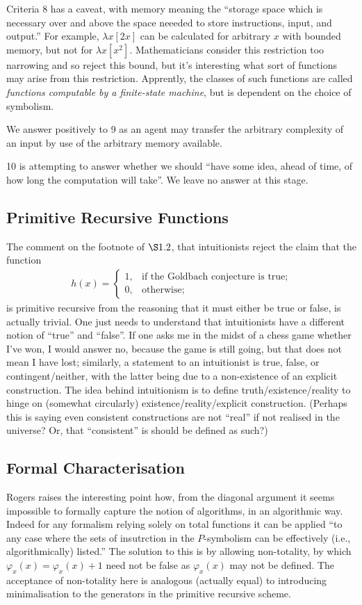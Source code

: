 \documentclass{article}
\theoremstyle{definition}
\begin{document}
Criteria 8 has a caveat, with memory meaning the ``storage space which is necessary over and above the space neeeded to store instructions, input, and output.'' For example, $\lambda x[2x]$ can be calculated for arbitrary $x$ with bounded memory, but not for $\lambda x[x^2]$. Mathematicians consider this restriction too narrowing and so reject this bound, but it's interesting what sort of functions may arise from this restriction. Apprently, the classes of such functions are called \emph{functions computable by a finite-state  machine}, but is dependent on the choice of symbolism.\par
We answer positively to 9 as an agent may transfer the arbitrary complexity of an input by use of the arbitrary memory available.\par
10 is attempting to answer whether we should ``have some idea, ahead of time, of how long the computation will take''. We leave no answer at this stage.
\subsection{Primitive Recursive Functions}
The comment on the footnote of $\S1.2$, that intuitionists reject the claim that the function
\begin{align*}
	h(x)=\begin{cases}
		1,&\text{if the Goldbach conjecture is true;}\\
		0,&\text{otherwise;}
	\end{cases}
\end{align*}
is primitive recursive from the reasoning that it must either be true or false, is actually trivial. One just needs to understand that intuitionists have a different notion of ``true'' and ``false''. If one asks me in the midst of a chess game whether I've won, I would answer no, because the game is still going, but that does not mean I have lost; similarly, a statement to an intuitionist is true, false, or contingent/neither, with the latter being due to a non-existence of an explicit construction. The idea behind intuitionism is to define truth/existence/reality to hinge on (somewhat circularly) existence/reality/explicit construction. (Perhaps this is saying even consistent constructions are not ``real'' if not realised in the universe? Or, that ``consistent'' is should be defined as such?)
\setcounter{subsection}{4}
\subsection{Formal Characterisation}
Rogers raises the interesting point how, from the diagonal argument it seems impossible to formally capture the notion of algorithms, in an algorithmic way. Indeed for any formalism relying solely on total functions it can be applied ``to any case where the sets of insutrction in the $P$-symbolism can be effectively (i.e., algorithmically) listed.'' The solution to this is by allowing non-totality, by which $\varphi_x(x)=\varphi_x(x)+1$ need not be false as $\varphi_x(x)$ may not be defined. The acceptance of non-totality here is analogous (actually equal) to introducing minimalisation to the generators in the primitive recursive scheme.
\setcounter{subsection}{7}
\end{document}
